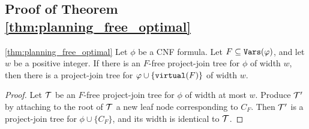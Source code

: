  \subsection{Proof of Theorem \ref{thm:planning_free_optimal}}
\begin{theorem}{\ref{thm:planning_free_optimal}}
Let $\phi$ be a CNF formula.
Let $F \subseteq \texttt{\upshape Vars}(\varphi)$, and let $w$ be a positive integer. %
If there is an $F$-free project-join tree for $\phi$ of width $w$, then there is a project-join tree for $\varphi \cup \{\texttt{\upshape virtual}(F)\}$ of width $w$.
\end{theorem}
\begin{proof}
Let $\mathcal{T}$ be an $F$-free project-join tree for $\phi$ of width at most $w$. 
Produce $\mathcal{T}'$ by attaching to the root of $\mathcal{T}$ a new leaf node corresponding to $C_F$. 
Then $\mathcal{T}'$ is a project-join tree for $\phi \cup \{C_F\}$, and its width is identical to $\mathcal{T}$.
\end{proof}



